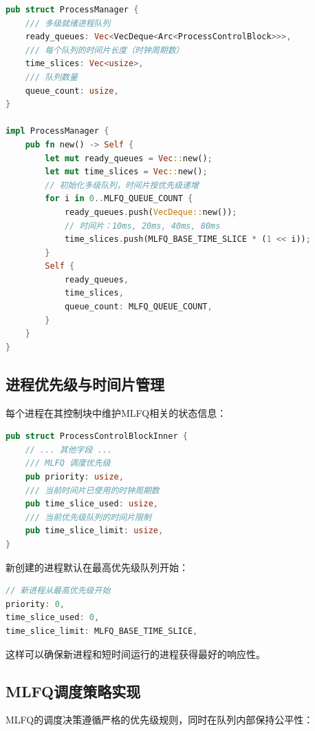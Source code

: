 \begin{lstlisting}[language=Rust,caption={MLFQ进程管理器结构}, label={lst:mlfq-manager}]
pub struct ProcessManager {
    /// 多级就绪进程队列
    ready_queues: Vec<VecDeque<Arc<ProcessControlBlock>>>,
    /// 每个队列的时间片长度（时钟周期数）
    time_slices: Vec<usize>,
    /// 队列数量
    queue_count: usize,
}

impl ProcessManager {
    pub fn new() -> Self {
        let mut ready_queues = Vec::new();
        let mut time_slices = Vec::new();
        // 初始化多级队列，时间片按优先级递增
        for i in 0..MLFQ_QUEUE_COUNT {
            ready_queues.push(VecDeque::new());
            // 时间片：10ms, 20ms, 40ms, 80ms
            time_slices.push(MLFQ_BASE_TIME_SLICE * (1 << i));
        }
        Self {
            ready_queues,
            time_slices,
            queue_count: MLFQ_QUEUE_COUNT,
        }
    }
}
\end{lstlisting}

\subsection{进程优先级与时间片管理}

每个进程在其控制块中维护MLFQ相关的状态信息：

\begin{lstlisting}[language=Rust,caption={进程MLFQ状态}, label={lst:process-mlfq-state}]
pub struct ProcessControlBlockInner {
    // ... 其他字段 ...
    /// MLFQ 调度优先级
    pub priority: usize,
    /// 当前时间片已使用的时钟周期数
    pub time_slice_used: usize,
    /// 当前优先级队列的时间片限制
    pub time_slice_limit: usize,
}
\end{lstlisting}

新创建的进程默认在最高优先级队列开始：

\begin{lstlisting}[language=Rust,caption={新进程优先级初始化}, label={lst:new-process-priority}]
// 新进程从最高优先级开始
priority: 0,
time_slice_used: 0,
time_slice_limit: MLFQ_BASE_TIME_SLICE,
\end{lstlisting}

这样可以确保新进程和短时间运行的进程获得最好的响应性。

\subsection{MLFQ调度策略实现}

MLFQ的调度决策遵循严格的优先级规则，同时在队列内部保持公平性：

